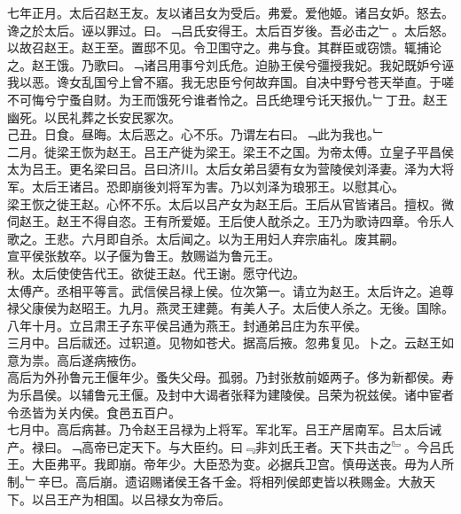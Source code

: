 \documentclass{zhvt-classic}
\begin{document}
\hspace*{2em}七年正月。太后召赵王友。友以诸吕女为受后。弗爱。爱他姬。诸吕女妒。怒去。谗之於太后。诬以罪过。曰。﹁吕氏安得王。太后百岁後。吾必击之﹂。太后怒。以故召赵王。赵王至。置邸不见。令卫围守之。弗与食。其群臣或窃馈。辄捕论之。赵王饿。乃歌曰。﹁诸吕用事兮刘氏危。迫胁王侯兮彊授我妃。我妃既妒兮诬我以恶。谗女乱国兮上曾不寤。我无忠臣兮何故弃国。自决中野兮苍天举直。于嗟不可悔兮宁蚤自财。为王而饿死兮谁者怜之。吕氏绝理兮讬天报仇。﹂丁丑。赵王幽死。以民礼葬之长安民冢次。\\
\hspace*{2em}己丑。日食。昼晦。太后恶之。心不乐。乃谓左右曰。﹁此为我也。﹂\\
\hspace*{2em}二月。徙梁王恢为赵王。吕王产徙为梁王。梁王不之国。为帝太傅。立皇子平昌侯太为吕王。更名梁曰吕。吕曰济川。太后女弟吕嬃有女为营陵侯刘泽妻。泽为大将军。太后王诸吕。恐即崩後刘将军为害。乃以刘泽为琅邪王。以慰其心。\\
\hspace*{2em}梁王恢之徙王赵。心怀不乐。太后以吕产女为赵王后。王后从官皆诸吕。擅权。微伺赵王。赵王不得自恣。王有所爱姬。王后使人酖杀之。王乃为歌诗四章。令乐人歌之。王悲。六月即自杀。太后闻之。以为王用妇人弃宗庙礼。废其嗣。\\
\hspace*{2em}宣平侯张敖卒。以子偃为鲁王。敖赐谥为鲁元王。\\
\hspace*{2em}秋。太后使使告代王。欲徙王赵。代王谢。愿守代边。\\
\hspace*{2em}太傅产。丞相平等言。武信侯吕禄上侯。位次第一。请立为赵王。太后许之。追尊禄父康侯为赵昭王。九月。燕灵王建薨。有美人子。太后使人杀之。无後。国除。八年十月。立吕肃王子东平侯吕通为燕王。封通弟吕庄为东平侯。\\
\hspace*{2em}三月中。吕后祓还。过轵道。见物如苍犬。据高后掖。忽弗复见。卜之。云赵王如意为祟。高后遂病掖伤。\\
\hspace*{2em}高后为外孙鲁元王偃年少。蚤失父母。孤弱。乃封张敖前姬两子。侈为新都侯。寿为乐昌侯。以辅鲁元王偃。及封中大谒者张释为建陵侯。吕荣为祝兹侯。诸中宦者令丞皆为关内侯。食邑五百户。\\
\hspace*{2em}七月中。高后病甚。乃令赵王吕禄为上将军。军北军。吕王产居南军。吕太后诫产。禄曰。﹁高帝已定天下。与大臣约。曰﹃非刘氏王者。天下共击之﹄。今吕氏王。大臣弗平。我即崩。帝年少。大臣恐为变。必据兵卫宫。慎毋送丧。毋为人所制。﹂辛巳。高后崩。遗诏赐诸侯王各千金。将相列侯郎吏皆以秩赐金。大赦天下。以吕王产为相国。以吕禄女为帝后。\\
\end{document}
